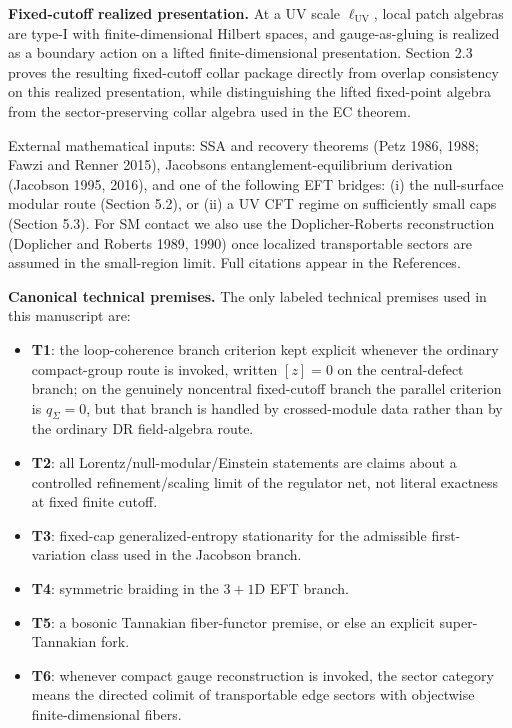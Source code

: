 \textbf{Fixed-cutoff realized presentation.} At a UV scale \(\ell_{\mathrm{UV}}\), local patch algebras are type-I with finite-dimensional Hilbert spaces, and gauge-as-gluing is realized as a boundary action on a lifted finite-dimensional presentation. Section 2.3 proves the resulting fixed-cutoff collar package directly from overlap consistency on this realized presentation, while distinguishing the lifted fixed-point algebra from the sector-preserving collar algebra used in the EC theorem.

External mathematical inputs: SSA and recovery theorems (Petz 1986, 1988; Fawzi and Renner 2015), Jacobson\textquotesingle s entanglement-equilibrium derivation (Jacobson 1995, 2016), and one of the following EFT bridges: (i) the null-surface modular route (Section 5.2), or (ii) a UV CFT regime on sufficiently small caps (Section 5.3). For SM contact we also use the Doplicher-Roberts reconstruction (Doplicher and Roberts 1989, 1990) once localized transportable sectors are assumed in the small-region limit. Full citations appear in the References.

\textbf{Canonical technical premises.} The only labeled technical premises used in this manuscript are:
\begin{itemize}
\tightlist
\item \textbf{T1}: the loop-coherence branch criterion kept explicit whenever the ordinary compact-group route is invoked, written \([z]=0\) on the central-defect branch; on the genuinely noncentral fixed-cutoff branch the parallel criterion is \(q_\Sigma=0\), but that branch is handled by crossed-module data rather than by the ordinary DR field-algebra route.
\item \textbf{T2}: all Lorentz/null-modular/Einstein statements are claims about a controlled refinement/scaling limit of the regulator net, not literal exactness at fixed finite cutoff.
\item \textbf{T3}: fixed-cap generalized-entropy stationarity for the admissible first-variation class used in the Jacobson branch.
\item \textbf{T4}: symmetric braiding in the \(3+1\)D EFT branch.
\item \textbf{T5}: a bosonic Tannakian fiber-functor premise, or else an explicit super-Tannakian fork.
\item \textbf{T6}: whenever compact gauge reconstruction is invoked, the sector category means the directed colimit of transportable edge sectors with objectwise finite-dimensional fibers.
\end{itemize}

